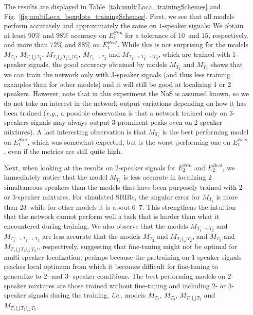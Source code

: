 The results are displayed in Table~\ref{tab:multiLoca_trainingSchemes} and Fig.~\ref{fig:multiLoca_boxplots_trainingSchemes}. First, we see that all models perform accurately and approximately the same on $1$-speaker signals: We obtain at least $90$\% and $98$\% accuracy on $E^{Sim}_1$ for a tolerance of $10$\textdegree~and $15$\textdegree, respectively, and more than $72$\% and $88$\% on $E^{Real}_1$. While this is not surprising for the models $M_{T_1}$, $M_{T_1 \bigcup T_2}$, $M_{T_1 \bigcup T_2 \bigcup T_3}$, $M_{T_1 \rightarrow T_2}$ and $M_{T_1 \rightarrow T_2 \rightarrow T_3}$, which are trained with $1$-speaker signals, the good accuracy obtained by models $M_{T_2}$ and $M_{T_3}$ shows that we can train the network only with $3$-speaker signals (and thus less training examples than for other models) and it will still be good at localizing $1$ or $2$ speakers. However, note that in this experiment the NoS is assumed known, so we do not take an interest in the network output variations depending on how it has been trained (\emph{e.g.}, a possible observation is that a network trained only on $3$-speakers signals may always output $3$ prominent peaks even on $2$-speaker mixtures). A last interesting observation is that $M_{T_1}$ is the best performing model on $E^{Sim}_1$, which was somewhat expected, but is the worst performing one on $E^{Real}_1$, even if the metrics are still quite high.

Next, when looking at the results on $2$-speaker signals for $E^{Sim}_2$ and $E^{Real}_2$, we immediately notice that the model $M_{T_1}$ is less accurate in localizing $2$ simultaneous speakers than the models that have been purposely trained with $2$- or $3$-speaker mixtures. For simulated SRIRs, the angular error for $M_{T_1}$ is more than $23$\textdegree~while for other models it is about $6$--$7$\textdegree. This strengthens the intuition that the network cannot perform well a task that is harder than what it encountered during training. We also observe that the models $M_{T_1 \rightarrow T_2}$ and $M_{T_1 \rightarrow T_2 \rightarrow T_3}$ are less accurate that the models $M_{T_2}$ and $M_{T_1 \bigcup T_2}$, and $M_{T_3}$ and $M_{T_1 \bigcup T_2 \bigcup T_3}$,, respectively, suggesting that fine-tuning might not be optimal for multi-speaker localization, perhaps because the pretraining on $1$-speaker signals reaches local optimum from which it becomes difficult for fine-tuning to generalize to $2$- and $3$- speaker conditions. The best performing models on $2$-speaker mixtures are those trained without fine-tuning and including $2$- or $3$-speaker signals during the training, \emph{i.e.}, models $M_{T_2}$, $M_{T_3}$, $M_{T_1 \bigcup T_2}$ and $M_{T_1 \bigcup T_2 \bigcup T_3}$.

